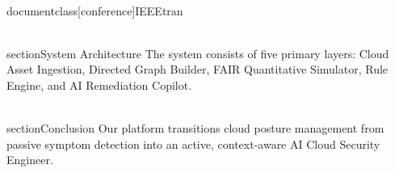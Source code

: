 \\documentclass[conference]{IEEEtran}
\begin{document}
\\section{System Architecture}
The system consists of five primary layers: Cloud Asset Ingestion, Directed Graph Builder, FAIR Quantitative Simulator, Rule Engine, and AI Remediation Copilot.

\\section{Conclusion}
Our platform transitions cloud posture management from passive symptom detection into an active, context-aware AI Cloud Security Engineer.

\
\end{document}
